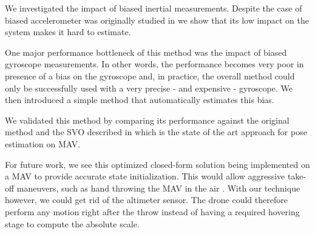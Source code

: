 \documentclass[letterpaper, 10 pt, conference]{ieeeconf}  %
\begin{document}
We investigated the impact of biased inertial measurements.
Despite the case of biased accelerometer was originally studied in \cite{Martinelli2014} we show that its low impact on the system makes it hard to estimate.

One major performance bottleneck of this method was the impact of biased gyroscope measurements.
In other words, the performance becomes very poor in presence of a bias on the gyroscope and, in practice, the overall method could only be successfully used with a very precise - and expensive - gyroscope.
We then introduced a simple method that automatically estimates this bias.



We validated this method by comparing its performance against the original method and the SVO described in \cite{Forster2014} which is the state of the art approach for pose estimation on MAV.

For future work, we see this optimized closed-form solution being implemented on a MAV to provide accurate state initialization.
This would allow aggressive take-off maneuvers, such as hand throwing the MAV in the air \cite{Faessler2015}.
With our technique however, we could get rid of the altimeter sensor.
The drone could therefore perform any motion right after the throw instead of having a required hovering stage to compute the absolute scale.



\end{document}

